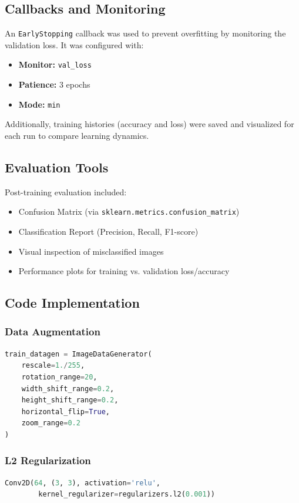 \documentclass{article}
\begin{document}
\subsection{Callbacks and Monitoring}
An \texttt{EarlyStopping} callback was used to prevent overfitting by monitoring the validation loss. It was configured with:
\begin{itemize}
    \item \textbf{Monitor:} \texttt{val\_loss}
    \item \textbf{Patience:} 3 epochs
    \item \textbf{Mode:} \texttt{min}
\end{itemize}

Additionally, training histories (accuracy and loss) were saved and visualized for each run to compare learning dynamics.

\subsection{Evaluation Tools}
Post-training evaluation included:
\begin{itemize}
    \item Confusion Matrix (via \texttt{sklearn.metrics.confusion\_matrix})
    \item Classification Report (Precision, Recall, F1-score)
    \item Visual inspection of misclassified images
    \item Performance plots for training vs. validation loss/accuracy
\end{itemize}

\subsection{Code Implementation}

\subsubsection*{Data Augmentation}
\begin{lstlisting}[language=Python]
train_datagen = ImageDataGenerator(
    rescale=1./255,
    rotation_range=20,
    width_shift_range=0.2,
    height_shift_range=0.2,
    horizontal_flip=True,
    zoom_range=0.2
)
\end{lstlisting}

\subsubsection*{L2 Regularization}
\begin{lstlisting}[language=Python]
Conv2D(64, (3, 3), activation='relu', 
        kernel_regularizer=regularizers.l2(0.001))
\end{lstlisting}
\end{document}
